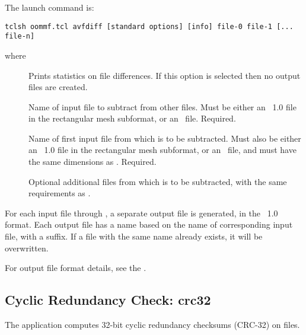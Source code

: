 The  launch command is:
\begin{verbatim}
tclsh oommf.tcl avfdiff [standard options] [info] file-0 file-1 [... file-n]
\end{verbatim}
where
\begin{description}
\item[]
  Prints statistics on file differences.  If this option is selected
  then no output files are created.
\item[]
  Name of input file to subtract from other files.  Must be either
  an \OVF\ 1.0 file in the rectangular mesh subformat, or an \VIO\
  file.  Required.
\item[]
  Name of first input file from which  is to be subtracted.
  Must also be either an \OVF\ 1.0 file in the rectangular mesh
  subformat, or an \VIO\ file, and must have the same dimensions as
  \cd{file-0}.  Required.
\item[]
  Optional additional files from which  is to be
  subtracted, with the same requirements as .
\end{description}

For each input file  through , a separate output
file is generated, in the \OVF\ 1.0 format.  Each output file has a
name based on the name of corresponding input file, with a 
suffix.  If a file with the same name already exists, it will be
overwritten.

For output file format details, see the .

\subsection{Cyclic Redundancy Check: crc32\label{sec:crc32}}%

The  application computes 32-bit cyclic redundancy checksums
(CRC-32) on files.

